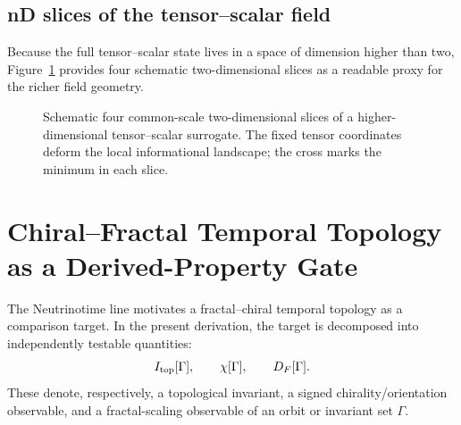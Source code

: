 \section{nD slices of the tensor--scalar field}
Because the full tensor--scalar state lives in a space of dimension higher than two, Figure~\ref{fig:nd-slices} provides four schematic two-dimensional slices as a readable proxy for the richer field geometry.
\begin{figure}[H]
  \centering
  \caption{Schematic four common-scale two-dimensional slices of a higher-dimensional tensor--scalar surrogate. The fixed tensor coordinates deform the local informational landscape; the cross marks the minimum in each slice.}
  \label{fig:nd-slices}
\end{figure}


\chapter[Chiral--Fractal Temporal Topology]{Chiral--Fractal Temporal Topology as a Derived-Property Gate}
The Neutrinotime line motivates a fractal--chiral temporal topology as a comparison target. In the present derivation, the target is decomposed into independently testable quantities:
\[
I_{\rm top}[\Gamma],\qquad \chi[\Gamma],\qquad D_F[\Gamma].
\]
These denote, respectively, a topological invariant, a signed chirality/orientation observable, and a fractal-scaling observable of an orbit or invariant set \(\Gamma\).

